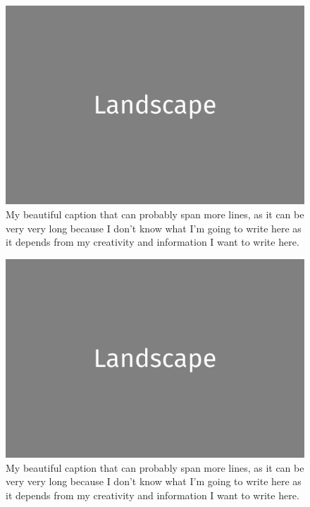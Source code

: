 \documentclass[a4paper,twoside]{book}
\begin{document}
\begin{figure}[H]
	\includegraphics[width=\textwidth]{landscape.png}
	\caption{My beautiful caption that can probably span more lines, as it can be very very long because I don't know what I'm going to write here as it depends from my creativity and information I want to write here.}
\end{figure}

\clearpage

\begin{figure}[H]
	\includegraphics[width=\textwidth]{landscape.png}
	\caption{My beautiful caption that can probably span more lines, as it can be very very long because I don't know what I'm going to write here as it depends from my creativity and information I want to write here.}
\end{figure}

\clearpage
\end{document}
